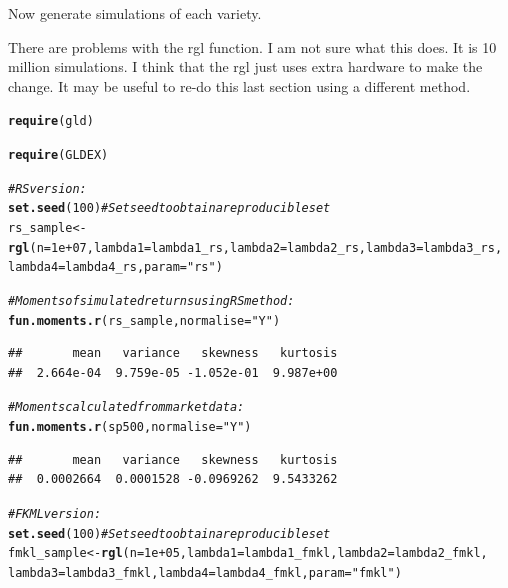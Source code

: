 \documentclass[12pt, a4paper, oneside]{article}\usepackage[]{graphicx}\usepackage[]{color}
\makeatletter
\newcommand{\hlstr}[1]{\textcolor[rgb]{0.192,0.494,0.8}{#1}}%
\newcommand{\hlcom}[1]{\textcolor[rgb]{0.678,0.584,0.686}{\textit{#1}}}%
\newcommand{\hlkwd}[1]{\textcolor[rgb]{0.737,0.353,0.396}{\textbf{#1}}}%
\newenvironment{kframe}{%
 \def\at@end@of@kframe{}%
 \ifinner\ifhmode%
  \def\at@end@of@kframe{\end{minipage}}%
  \begin{minipage}{\columnwidth}%
 \fi\fi%
 \def\FrameCommand##1{\hskip\@totalleftmargin \hskip-\fboxsep
 \colorbox{shadecolor}{##1}\hskip-\fboxsep
     \hskip-\linewidth \hskip-\@totalleftmargin \hskip\columnwidth}%
 \MakeFramed {\advance\hsize-\width
   \@totalleftmargin\z@ \linewidth\hsize
   \@setminipage}}%
 {\par\unskip\endMakeFramed%
 \at@end@of@kframe}
\newenvironment{knitrout}{}{} %
\makeatother
\begin{document}
Now generate simulations of each variety. 

There are problems with the rgl function.  I am not sure what this does.  It is 10 million simulations.  I think that the rgl just uses extra hardware to make the change. It may be useful to re-do this last section using a different method. 
\begin{knitrout}
\color{fgcolor}\begin{kframe}
\begin{alltt}
\hlkwd{require}(gld)
\end{alltt}


{\ttfamily\noindent\itshape\color{messagecolor}{\#\# Loading required package: gld}}\begin{alltt}
\hlkwd{require}(GLDEX)
\end{alltt}


{\ttfamily\noindent\itshape\color{messagecolor}{\#\# Loading required package: GLDEX\\\#\# Loading required package: cluster}}\begin{alltt}
\hlcom{# RS version:}
\hlkwd{set.seed}(100)  \hlcom{# Set seed to obtain a reproducible set}
rs_sample <- \hlkwd{rgl}(n = 1e+07, lambda1 = lambda1_rs, lambda2 = lambda2_rs, lambda3 = lambda3_rs, 
    lambda4 = lambda4_rs, param = \hlstr{"rs"})

\hlcom{# Moments of simulated returns using RS method:}
\hlkwd{fun.moments.r}(rs_sample, normalise = \hlstr{"Y"})
\end{alltt}
\begin{verbatim}
##       mean   variance   skewness   kurtosis 
##  2.664e-04  9.759e-05 -1.052e-01  9.987e+00
\end{verbatim}
\begin{alltt}

\hlcom{# Moments calculated from market data:}
\hlkwd{fun.moments.r}(sp500, normalise = \hlstr{"Y"})
\end{alltt}
\begin{verbatim}
##       mean   variance   skewness   kurtosis 
##  0.0002664  0.0001528 -0.0969262  9.5433262
\end{verbatim}
\begin{alltt}

\hlcom{# FKML version:}
\hlkwd{set.seed}(100)  \hlcom{# Set seed to obtain a reproducible set}
fmkl_sample <- \hlkwd{rgl}(n = 1e+05, lambda1 = lambda1_fmkl, lambda2 = lambda2_fmkl, 
    lambda3 = lambda3_fmkl, lambda4 = lambda4_fmkl, param = \hlstr{"fmkl"})


\end{alltt}
\end{kframe}
\end{knitrout}
\end{document}
